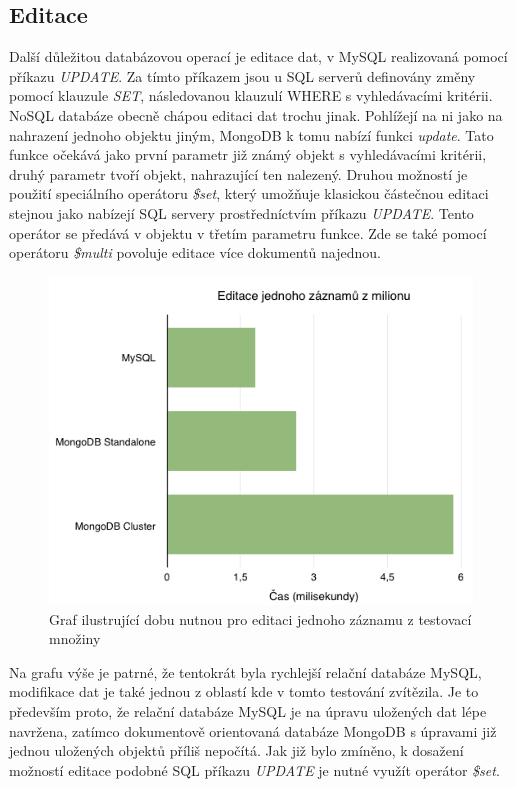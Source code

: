 \subsection{Editace}
Další důležitou databázovou operací je editace dat, v MySQL realizovaná pomocí příkazu \emph{UPDATE}. Za tímto příkazem jsou u SQL serverů definovány změny pomocí klauzule \emph{SET}, následovanou klauzulí WHERE s vyhledávacími kritérii. NoSQL databáze obecně chápou editaci dat trochu jinak. Pohlížejí na ni jako na nahrazení jednoho objektu jiným, MongoDB k tomu nabízí funkci \emph{update}. Tato funkce očekává jako první parametr již známý objekt s vyhledávacími kritérii, druhý parametr tvoří objekt, nahrazující ten nalezený. Druhou možností je použití speciálního operátoru \emph{\$set}, který umožňuje klasickou částečnou editaci stejnou jako nabízejí SQL servery prostředníctvím příkazu \emph{UPDATE}. Tento operátor se předává v objektu v třetím parametru funkce. Zde se také pomocí operátoru \emph{\$multi} povoluje editace více dokumentů najednou.

\begin{figure}[h]
\begin{centering}
\includegraphics[scale=0.5]{obrazky/grafy/update}
\par\end{centering}
\caption{Graf ilustrující dobu nutnou pro editaci jednoho záznamu z testovací množiny}
\end{figure}
\FloatBarrier
Na grafu výše je patrné, že tentokrát byla rychlejší relační databáze MySQL, modifikace dat je také jednou z oblastí kde v tomto testování zvítězila. Je to především proto, že relační databáze MySQL je na úpravu uložených dat lépe navržena, zatímco dokumentově orientovaná databáze MongoDB s úpravami již jednou uložených objektů příliš nepočítá. Jak již bylo zmíněno, k dosažení možností editace podobné SQL příkazu \emph{UPDATE} je nutné využít operátor \emph{\$set}.


